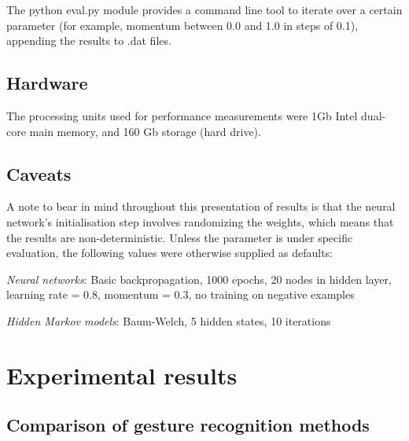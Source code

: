 \documentclass[12pt,a4,notitlepage]{report}
\renewcommand{\_}{\texttt{\symbol{95}}}
\newcommand{\<}{\texttt{\symbol{60}}}
\renewcommand{\>}{\texttt{\symbol{62}}}
\begin{document}
The python eval.py module provides a command line tool to iterate over a certain parameter (for example, momentum between 0.0 and 1.0 in steps of 0.1), appending the results to .dat files.

\subsection{Hardware}

The processing units used for performance measurements were 1Gb Intel dual-core main memory, and 160 Gb storage (hard drive).

\subsection{Caveats}

A note to bear in mind throughout this presentation of results is that the neural network's initialisation step involves randomizing the weights, which means that the results are non-deterministic. Unless the parameter is under specific evaluation, the following values were otherwise supplied as defaults:

\textit{Neural networks}: Basic backpropagation, 1000 epochs, 20 nodes in hidden layer, learning rate = 0.8, momentum = 0.3, no training on negative examples

\textit{Hidden Markov models}: Baum-Welch, 5 hidden states, 10 iterations

\section{Experimental results}

\subsection{Comparison of gesture recognition methods}
\end{document}
